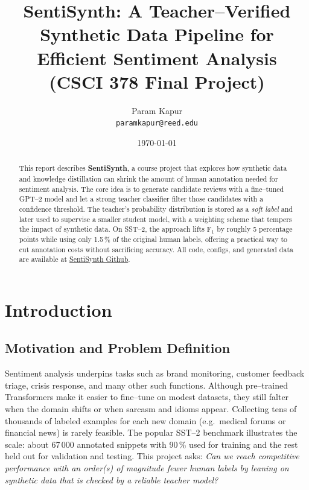 \documentclass[11pt]{article}
\title{\bfseries SentiSynth: A Teacher--Verified Synthetic Data Pipeline
for Efficient Sentiment Analysis \\ {\large (CSCI 378 Final Project)}}
\author{Param Kapur \\
\texttt{paramkapur@reed.edu}}
\date{\today}
\begin{document}
\maketitle
\vspace{-1em}

\begin{abstract}
  This report describes \textbf{SentiSynth}, a course project that
  explores how synthetic data and knowledge distillation can shrink
  the amount of human annotation needed for sentiment analysis.
  The core idea is to generate candidate reviews with a fine--tuned
  GPT--2 model and let a strong teacher classifier filter those
  candidates with a confidence threshold.  The teacher's probability
  distribution is stored as a \emph{soft label} and later used to
  supervise a smaller student model, with a weighting scheme that
  tempers the impact of synthetic data.  On SST--2, the approach lifts
  F$_1$ by roughly 5 percentage points while using only 1.5\,\% of the
  original human labels, offering a practical way to cut annotation
  costs without sacrificing accuracy.  All code, configs, and generated
  data are available at
  \href{https://github.com/paramkpr/SentiSynth}{SentiSynth Github}.
\end{abstract}

\section{Introduction}

\subsection{Motivation and Problem Definition}
Sentiment analysis underpins tasks such as brand monitoring, customer
feedback triage, crisis response, and many other such functions.  Although
pre--trained Transformers make it easier to fine--tune on modest
datasets, they still falter when the domain shifts or when sarcasm and
idioms appear.  Collecting tens of thousands of labeled examples for
each new domain (e.g.\ medical forums or financial news) is rarely
feasible.  The popular SST--2 benchmark illustrates the scale: about
67\,000 annotated snippets with 90\,\% used for training and the rest
held out for validation and testing.  This project
asks: \emph{Can we reach competitive performance with an order(s) of
  magnitude fewer human labels by leaning on synthetic data that is
checked by a reliable teacher model?}
\end{document}
